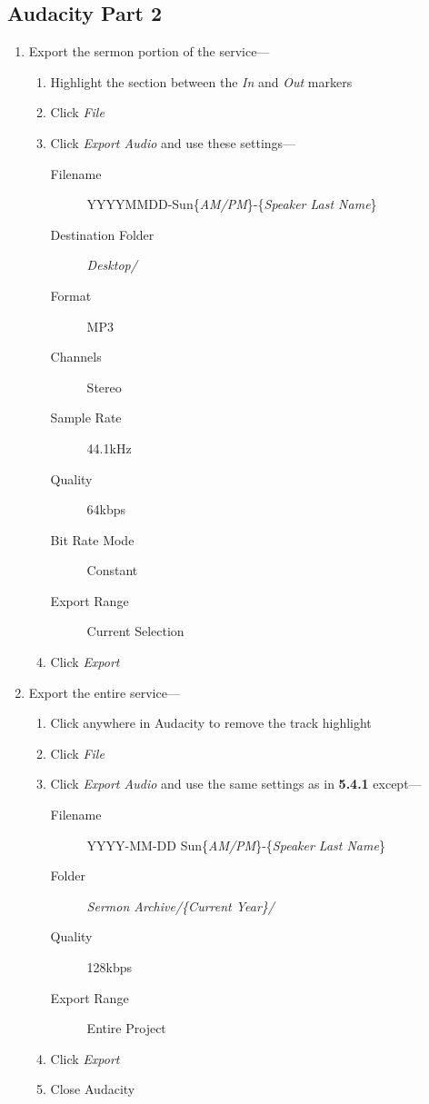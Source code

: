 \documentclass[12pt]{article}
\begin{document}
    \subsection{Audacity Part 2}
    \begin{enumerate}
        \item Export the sermon portion of the service---
        \begin{enumerate}
            \item Highlight the section between the \emph{In} and \emph{Out} markers
            \item Click \emph{File}
            \newpage
            \item Click \emph{Export Audio} and use these settings---
            \begin{description}
                \item [Filename] YYYYMMDD-Sun\{\emph{AM/PM}\}-\{\emph{Speaker Last Name}\}
                \item [Destination Folder] \emph{Desktop/}
                \item [Format] MP3
                \item [Channels] Stereo
                \item [Sample Rate] 44.1kHz
                \item [Quality] 64kbps
                \item [Bit Rate Mode] Constant
                \item [Export Range] Current Selection
            \end{description}
            \item Click \emph{Export}
        \end{enumerate}
        \item Export the entire service---
        \begin{enumerate}
            \item Click anywhere in Audacity to remove the track highlight
            \item Click \emph{File}
            \item Click \emph{Export Audio} and use the same settings as in \textbf{5.4.1} except---
            \begin{description}
                \item [Filename] YYYY-MM-DD Sun\{\emph{AM/PM}\}-\{\emph{Speaker Last Name}\}
                \item [Folder] \emph{Sermon Archive/\{Current Year\}/}
                \item [Quality] 128kbps
                \item [Export Range] Entire Project
            \end{description}
            \item Click \emph{Export}
            \item Close Audacity
        \end{enumerate}
    \end{enumerate}
\end{document}
